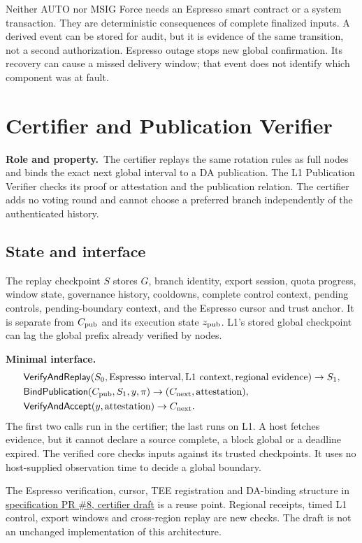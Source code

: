 \documentclass[11pt,a4paper]{article}
\newcommand{\api}[1]{\ensuremath{\mathsf{#1}}}
\newcommand{\role}{\textbf{Role and property.}\ }
\newcommand{\iface}{\textbf{Minimal interface.}\ }
\begin{document}
Neither AUTO nor MSIG Force needs an Espresso smart contract or a system
transaction. They are deterministic consequences of complete finalized
inputs. A derived event can be stored for audit, but it is evidence of
the same transition, not a second authorization. Espresso outage stops
new global confirmation. Its recovery can cause a missed delivery
window; that event does not identify which component was at fault.

\section{Certifier and Publication Verifier}\label{sec:publication}
\role The certifier replays the same rotation rules as full nodes and
binds the exact next global interval to a DA publication. The L1
Publication Verifier checks its proof or attestation and the publication
relation. The certifier adds no voting round and cannot choose a
preferred branch independently of the authenticated history.

\subsection{State and interface}
The replay checkpoint $S$ stores $G$, branch identity, export session,
quota progress, window state, governance history, cooldowns, complete
control context, pending controls, pending-boundary context, and the
Espresso cursor and trust anchor. It is separate from $C_{\rm pub}$ and its execution state
$z_{\rm pub}$. L1's stored global checkpoint can lag the global prefix
already verified by nodes.

\iface
\[
\begin{aligned}
 &\api{VerifyAndReplay}(S_0,\text{Espresso interval},
       \text{L1 context},\text{regional evidence})\to S_1,\\
 &\api{BindPublication}(C_{\rm pub},S_1,y,\pi)
       \to(C_{\rm next},\text{attestation}),\\
 &\api{VerifyAndAccept}(y,\text{attestation})\to C_{\rm next}.
\end{aligned}
\]
The first two calls run in the certifier; the last runs on L1.
A host fetches evidence, but it cannot declare a source complete,
a block global or a deadline expired. The verified core checks inputs
against its trusted checkpoints. It uses no host-supplied observation
time to decide a global boundary.

The Espresso verification, cursor, TEE registration and DA-binding
structure in
\href{https://github.com/megaeth-labs/specification/blob/aedc2826663b134ee25d26bea17e70c6d23d321c/specs/block-certification/certifier.md}{specification PR \#8, certifier draft}
is a reuse point. Regional receipts, timed L1 control, export windows and
cross-region replay are new checks. The draft is not an unchanged
implementation of this architecture.
\end{document}
